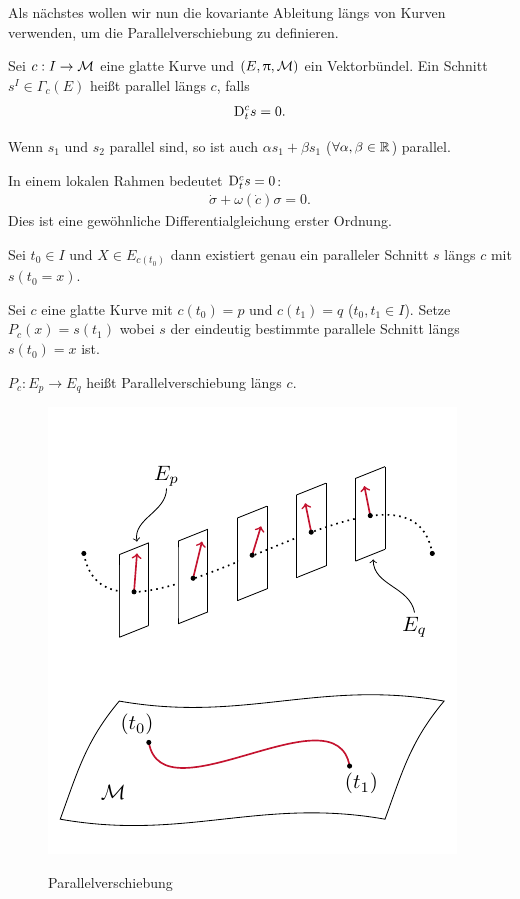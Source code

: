 Als nächstes wollen wir nun die kovariante Ableitung längs von Kurven verwenden, um die Parallelverschiebung zu definieren.
\begin{defs}[Parallelität]
Sei $c: I \to \mathcal{M}$ eine glatte Kurve und $(E, \uppi, \mathcal{M})$ ein Vektorbündel.
Ein Schnitt $s^I \in \Gamma_c (E)$ heißt parallel längs $c$, falls 
\begin{align}
\mathrm{D}^c_t s = 0.
\end{align}
\end{defs}
\begin{bem}
Wenn $s_1$ und $s_2$ parallel sind, so ist auch $\alpha s_1 + \beta s_1$ ($\forall \alpha, \beta \in \mathbb{R}$) parallel.
\end{bem}
In einem lokalen Rahmen bedeutet $\mathrm{D}^c_t s = 0$:
\begin{align}
\dot{\sigma} + \omega(\dot{c}) \sigma = 0.
\end{align}
Dies ist eine gewöhnliche Differentialgleichung erster Ordnung.
\begin{lem}
Sei $t_0 \in I$ und $X \in E_{c(t_0)}$ dann existiert genau ein paralleler Schnitt $s$ längs $c$ mit $s(t_0 = x)$.
\end{lem}
Sei $c$ eine glatte Kurve mit $c(t_0) = p$ und $c(t_1)=q$ ($t_0, t_1 \in I$).
Setze $P_c(x) = s(t_1)$ wobei $s$ der eindeutig bestimmte parallele Schnitt längs $s(t_0) = x$ ist.
\begin{defs}[Parallelverschiebung]
$P_c : E_p \to E_q$ heißt Parallelverschiebung längs $c$.
\begin{figure}[H]
\centering
\includegraphics[width=0.7\linewidth]{figures/tikz/parallel_shift_dgl.pdf}
\label{img:parallel_shift:dgl}
\caption{Parallelverschiebung}
\end{figure} 
\end{defs}
